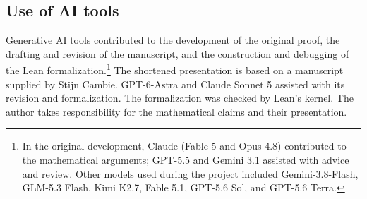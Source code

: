 \documentclass[11pt,a4paper,reqno]{amsart}
\theoremstyle{definition}
\theoremstyle{remark}
\begin{document}
\begin{samepage}
\section*{Use of AI tools}
Generative AI tools contributed to the development of the original proof,
the drafting and revision of the manuscript, and the construction and debugging
of the Lean formalization.\footnote{In the original development, Claude
(Fable 5 and Opus 4.8) contributed to the mathematical arguments; GPT-5.5 and
Gemini 3.1 assisted with advice and review. Other models used during the project
included Gemini-3.8-Flash, GLM-5.3 Flash, Kimi K2.7, Fable 5.1, GPT-5.6 Sol,
and GPT-5.6 Terra.}
The shortened presentation is based on a manuscript supplied by Stijn Cambie.
GPT-6-Astra and Claude Sonnet 5 assisted with its revision and formalization.
The formalization was checked by Lean's kernel. The author takes responsibility
for the mathematical claims and their presentation.\par
\end{samepage}

\appendix
\end{document}
